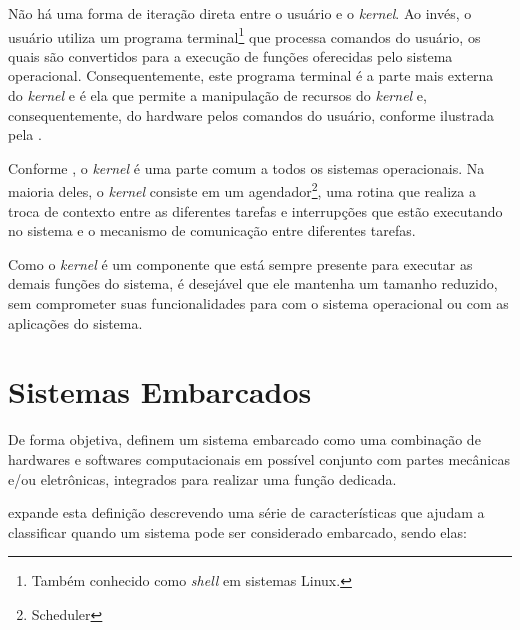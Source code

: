 
Não há uma forma de iteração direta entre o usuário e o \emph{kernel}. Ao invés, o usuário utiliza um programa terminal\footnote{Também conhecido como \emph{shell} em sistemas Linux.} que processa comandos do usuário, os quais são convertidos para a execução de funções oferecidas pelo sistema operacional. Consequentemente, este programa terminal é a parte mais externa do \emph{kernel} e é ela que permite a manipulação de recursos do \emph{kernel} e, consequentemente, do hardware pelos comandos do usuário, conforme ilustrada pela .


Conforme , o \emph{kernel} é uma parte comum a todos os sistemas operacionais. Na maioria deles, o \emph{kernel} consiste em um agendador\footnote{Scheduler}, uma rotina que realiza a troca de contexto entre as diferentes tarefas e interrupções que estão executando no sistema e o mecanismo de comunicação entre diferentes tarefas.

Como o \emph{kernel} é um componente que está sempre presente para executar as demais funções do sistema, é desejável que ele mantenha um tamanho reduzido, sem comprometer suas funcionalidades para com o sistema operacional ou com as aplicações do sistema.

\section{Sistemas Embarcados}

De forma objetiva,  definem um sistema embarcado como uma combinação de hardwares e softwares computacionais em possível conjunto com partes mecânicas e/ou eletrônicas, integrados para realizar uma função dedicada.

 expande esta definição descrevendo uma série de características que ajudam a classificar quando um sistema pode ser considerado embarcado, sendo elas:

